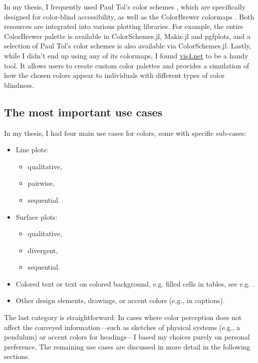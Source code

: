In my thesis, I frequently used Paul Tol’s color schemes \cite{paultol}, which are specifically designed for color-blind accessibility, as well as the ColorBrewer colormaps \cite{colorbrewer}. Both resources are integrated into various plotting libraries. For example, the entire ColorBrewer palette is available in ColorSchemes.jl, Makie.jl and pgfplots, and a selection of Paul Tol's color schemes is also available via ColorSchemes.jl.
Lastly, while I didn’t end up using any of its colormaps, I found \href{https://www.vis4.net/palettes/}{vis4.net} \cite{chromajs} to be a handy tool. It allows users to create custom color palettes and provides a simulation of how the chosen colors appear to individuals with different types of color blindness.

\subsection{The most important use cases}
In my thesis, I had four main use cases for colors, some with specific sub-cases:
\begin{itemize}
	\item Line plots:
		\begin{itemize}
			\item qualitative,
			\item pairwise,
			\item sequential. 
		\end{itemize}
	\item Surface plots:
		\begin{itemize}
			\item qualitative,
			\item divergent,
			\item sequential. 
		\end{itemize}
	\item Colored text or text on colored background, e.g. filled cells in tables, see e.g. .
	\item Other design elements, drawings, or accent colors (e.g., in captions).
\end{itemize}
The last category is straightforward: In cases where color perception does not affect the conveyed information---such as sketches of physical systems (e.g., a pendulum) or accent colors for headings---I based my choices purely on personal preference. The remaining use cases are discussed in more detail in the following sections.

